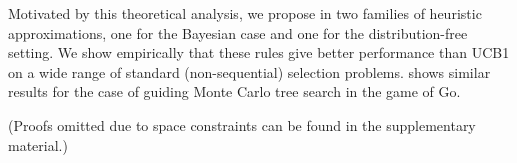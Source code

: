Motivated by this theoretical analysis, we propose in 
two families of heuristic approximations, one for the
Bayesian case and one for the distribution-free setting.
We show empirically that these rules give better performance than UCB1 on 
a wide range of standard (non-sequential) selection problems.
 shows similar results for the case of guiding Monte Carlo tree search
in the game of Go.

(Proofs omitted due to space constraints can be found in the supplementary material.)